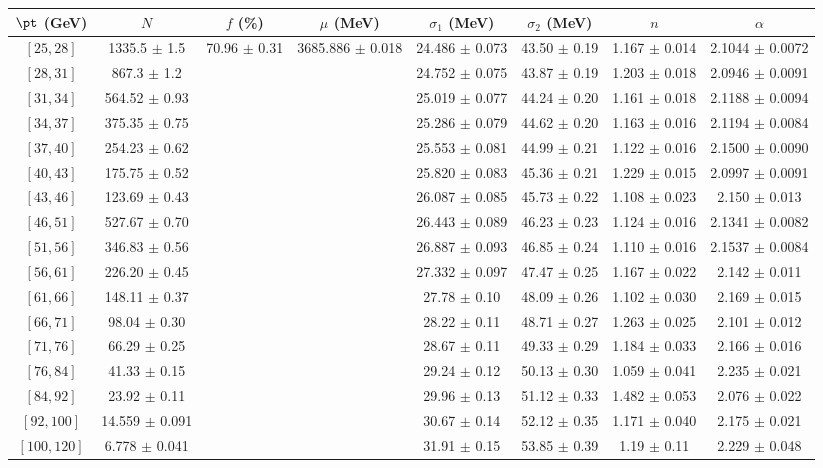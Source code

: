 \begin{tabular}{c||c|c|c|c|c|c|c}
$\pt$ (GeV) & $N$ & $f$ (\%) & $\mu$ (MeV) & $\sigma_1$ (MeV) & $\sigma_2$ (MeV) & $n$ & $\alpha$ \\
\hline
$[25, 28]$ & 1335.5 $\pm$ 1.5 & \multirow{17}{*}{70.96 $\pm$ 0.31} & \multirow{17}{*}{3685.886 $\pm$ 0.018} & 24.486 $\pm$ 0.073 & 43.50 $\pm$ 0.19 & 1.167 $\pm$ 0.014 & 2.1044 $\pm$ 0.0072\\
$[28, 31]$ & 867.3 $\pm$ 1.2 &  &  & 24.752 $\pm$ 0.075 & 43.87 $\pm$ 0.19 & 1.203 $\pm$ 0.018 & 2.0946 $\pm$ 0.0091\\
$[31, 34]$ & 564.52 $\pm$ 0.93 &  &  & 25.019 $\pm$ 0.077 & 44.24 $\pm$ 0.20 & 1.161 $\pm$ 0.018 & 2.1188 $\pm$ 0.0094\\
$[34, 37]$ & 375.35 $\pm$ 0.75 &  &  & 25.286 $\pm$ 0.079 & 44.62 $\pm$ 0.20 & 1.163 $\pm$ 0.016 & 2.1194 $\pm$ 0.0084\\
$[37, 40]$ & 254.23 $\pm$ 0.62 &  &  & 25.553 $\pm$ 0.081 & 44.99 $\pm$ 0.21 & 1.122 $\pm$ 0.016 & 2.1500 $\pm$ 0.0090\\
$[40, 43]$ & 175.75 $\pm$ 0.52 &  &  & 25.820 $\pm$ 0.083 & 45.36 $\pm$ 0.21 & 1.229 $\pm$ 0.015 & 2.0997 $\pm$ 0.0091\\
$[43, 46]$ & 123.69 $\pm$ 0.43 &  &  & 26.087 $\pm$ 0.085 & 45.73 $\pm$ 0.22 & 1.108 $\pm$ 0.023 & 2.150 $\pm$ 0.013\\
$[46, 51]$ & 527.67 $\pm$ 0.70 &  &  & 26.443 $\pm$ 0.089 & 46.23 $\pm$ 0.23 & 1.124 $\pm$ 0.016 & 2.1341 $\pm$ 0.0082\\
$[51, 56]$ & 346.83 $\pm$ 0.56 &  &  & 26.887 $\pm$ 0.093 & 46.85 $\pm$ 0.24 & 1.110 $\pm$ 0.016 & 2.1537 $\pm$ 0.0084\\
$[56, 61]$ & 226.20 $\pm$ 0.45 &  &  & 27.332 $\pm$ 0.097 & 47.47 $\pm$ 0.25 & 1.167 $\pm$ 0.022 & 2.142 $\pm$ 0.011\\
$[61, 66]$ & 148.11 $\pm$ 0.37 &  &  & 27.78 $\pm$ 0.10 & 48.09 $\pm$ 0.26 & 1.102 $\pm$ 0.030 & 2.169 $\pm$ 0.015\\
$[66, 71]$ & 98.04 $\pm$ 0.30 &  &  & 28.22 $\pm$ 0.11 & 48.71 $\pm$ 0.27 & 1.263 $\pm$ 0.025 & 2.101 $\pm$ 0.012\\
$[71, 76]$ & 66.29 $\pm$ 0.25 &  &  & 28.67 $\pm$ 0.11 & 49.33 $\pm$ 0.29 & 1.184 $\pm$ 0.033 & 2.166 $\pm$ 0.016\\
$[76, 84]$ & 41.33 $\pm$ 0.15 &  &  & 29.24 $\pm$ 0.12 & 50.13 $\pm$ 0.30 & 1.059 $\pm$ 0.041 & 2.235 $\pm$ 0.021\\
$[84, 92]$ & 23.92 $\pm$ 0.11 &  &  & 29.96 $\pm$ 0.13 & 51.12 $\pm$ 0.33 & 1.482 $\pm$ 0.053 & 2.076 $\pm$ 0.022\\
$[92, 100]$ & 14.559 $\pm$ 0.091 &  &  & 30.67 $\pm$ 0.14 & 52.12 $\pm$ 0.35 & 1.171 $\pm$ 0.040 & 2.175 $\pm$ 0.021\\
$[100, 120]$ & 6.778 $\pm$ 0.041 &  &  & 31.91 $\pm$ 0.15 & 53.85 $\pm$ 0.39 & 1.19 $\pm$ 0.11 & 2.229 $\pm$ 0.048\\
\end{tabular}
